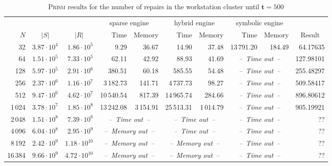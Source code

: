 \documentclass[10pt,twocolumn]{article}
\newcommand{\PRISM}{\textsc{Prism}\xspace}
\newcommand{\timelimit}{\emph{--~Time out~--}}
\newcommand{\memlimit}{\emph{--~Memory out~--}}
\newcommand{\timeb}{\mathbf{t}}
\begin{document}
  \setlength{\tabcolsep}{0.6mm}
\begin{table*}
  \centering
  \caption{\PRISM results for the number of repairs in the workstation cluster until $\timeb=500$}
  \label{tab:cluster_detailed_prism}
\begin{tabular}{|rrr|rr|rr|rr|r|}
  \hline
    && & \multicolumn{2}{c|}{sparse engine} & \multicolumn{2}{c|}{hybrid engine} & \multicolumn{2}{c|}{symbolic engine} & \\
  $N$ & \multicolumn{1}{c}{$|S|$} & \multicolumn{1}{c|}{$|R|$} & Time & Memory & Time & Memory & Time & Memory & \multicolumn{1}{c|}{Result} \\
  \hline
  32 & $ 3.87 \cdot 10^{4} $ & $ 1.86 \cdot 10^{5} $ & 9.29 & 36.67 & 14.90 & 37.48 & 13\,791.20 & 184.49 & 64.17635 \\
  64 & $ 1.51 \cdot 10^{5} $ & $ 7.33 \cdot 10^{5} $ & 62.11 & 42.92 & 88.93 & 41.69 & \multicolumn{2}{c|}{\timelimit} & 127.98101 \\
  128 & $ 5.97 \cdot 10^{5} $ & $ 2.91 \cdot 10^{6} $ & 380.51 & 60.18 & 585.55 & 54.48 & \multicolumn{2}{c|}{\timelimit} & 255.48297 \\
  256 & $ 2.37 \cdot 10^{6} $ & $ 1.16 \cdot 10^{7} $ & 3\,182.73 & 141.71 & 4\,737.73 & 98.27 & \multicolumn{2}{c|}{\timelimit} & 509.58417 \\
  512 & $ 9.47 \cdot 10^{6} $ & $ 4.62 \cdot 10^{7} $ & 10\,540.54 & 817.39 & 14\,965.74 & 284.66 & \multicolumn{2}{c|}{\timelimit} & 896.80612 \\
  1\,024 & $ 3.78 \cdot 10^{7} $ & $ 1.85 \cdot 10^{8} $ & 13\,242.08 & 3\,154.91 & 25\,513.31 & 1\,014.79 & \multicolumn{2}{c|}{\timelimit} & 905.19921 \\
  2\,048 & $ 1.51 \cdot 10^{8} $ & $ 7.39 \cdot 10^{8} $ & \multicolumn{2}{c|}{\timelimit} & \multicolumn{2}{c|}{\timelimit} & \multicolumn{2}{c|}{\timelimit} & ?? \\
  4\,096 & $ 6.04 \cdot 10^{8} $ & $ 2.95 \cdot 10^{9} $ & \multicolumn{2}{c|}{\memlimit} & \multicolumn{2}{c|}{\timelimit} & \multicolumn{2}{c|}{\timelimit} & ?? \\
  8\,192 & $ 2.42 \cdot 10^{9} $ & $ 1.18 \cdot 10^{10} $ & \multicolumn{2}{c|}{\memlimit} & \multicolumn{2}{c|}{\memlimit} & \multicolumn{2}{c|}{\timelimit} & ?? \\
  16\,384 & $ 9.66 \cdot 10^{9} $ & $ 4.72 \cdot 10^{10} $ & \multicolumn{2}{c|}{\memlimit} & \multicolumn{2}{c|}{\memlimit} & \multicolumn{2}{c|}{\timelimit} & ?? \\
  \hline
\end{tabular}
\end{table*}
\end{document}
